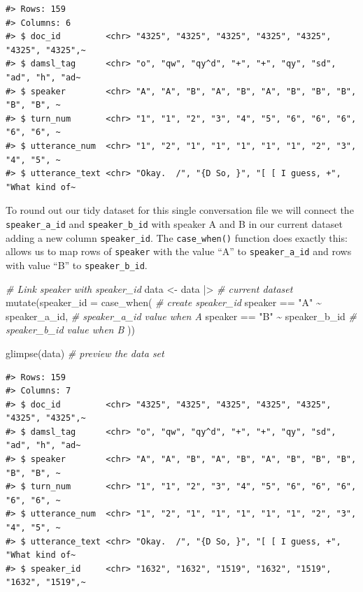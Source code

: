 \documentclass[
  letterpaper,
]{latex/krantz}
\newenvironment{Shaded}{\begin{snugshade}}{\end{snugshade}}
\newcommand{\AttributeTok}[1]{\textcolor[rgb]{0.00,0.00,0.00}{#1}}
\newcommand{\CommentTok}[1]{\textcolor[rgb]{0.00,0.00,0.00}{\textit{#1}}}
\newcommand{\FunctionTok}[1]{\textcolor[rgb]{0.00,0.00,0.00}{#1}}
\newcommand{\NormalTok}[1]{\textcolor[rgb]{0.00,0.00,0.00}{#1}}
\newcommand{\OtherTok}[1]{\textcolor[rgb]{0.00,0.00,0.00}{#1}}
\newcommand{\SpecialCharTok}[1]{\textcolor[rgb]{0.00,0.00,0.00}{#1}}
\newcommand{\StringTok}[1]{\textcolor[rgb]{0.00,0.00,0.00}{#1}}
\begin{document}
\begin{verbatim}
#> Rows: 159
#> Columns: 6
#> $ doc_id         <chr> "4325", "4325", "4325", "4325", "4325", "4325", "4325",~
#> $ damsl_tag      <chr> "o", "qw", "qy^d", "+", "+", "qy", "sd", "ad", "h", "ad~
#> $ speaker        <chr> "A", "A", "B", "A", "B", "A", "B", "B", "B", "B", "B", ~
#> $ turn_num       <chr> "1", "1", "2", "3", "4", "5", "6", "6", "6", "6", "6", ~
#> $ utterance_num  <chr> "1", "2", "1", "1", "1", "1", "1", "2", "3", "4", "5", ~
#> $ utterance_text <chr> "Okay.  /", "{D So, }", "[ [ I guess, +", "What kind of~
\end{verbatim}

To round out our tidy dataset for this single conversation file we will
connect the \texttt{speaker\_a\_id} and \texttt{speaker\_b\_id} with
speaker A and B in our current dataset adding a new column
\texttt{speaker\_id}. The \texttt{case\_when()} function does exactly
this: allows us to map rows of \texttt{speaker} with the value ``A'' to
\texttt{speaker\_a\_id} and rows with value ``B'' to
\texttt{speaker\_b\_id}.

\begin{Shaded}
\begin{Highlighting}[]
\CommentTok{\# Link speaker with speaker\_id}
\NormalTok{data }\OtherTok{\textless{}{-}} 
\NormalTok{  data }\SpecialCharTok{|\textgreater{}} \CommentTok{\# current dataset}
  \FunctionTok{mutate}\NormalTok{(}\AttributeTok{speaker\_id =} \FunctionTok{case\_when}\NormalTok{( }\CommentTok{\# create speaker\_id}
\NormalTok{    speaker }\SpecialCharTok{==} \StringTok{"A"} \SpecialCharTok{\textasciitilde{}}\NormalTok{ speaker\_a\_id, }\CommentTok{\# speaker\_a\_id value when A}
\NormalTok{    speaker }\SpecialCharTok{==} \StringTok{"B"} \SpecialCharTok{\textasciitilde{}}\NormalTok{ speaker\_b\_id }\CommentTok{\# speaker\_b\_id value when B}
\NormalTok{  ))}

\FunctionTok{glimpse}\NormalTok{(data) }\CommentTok{\# preview the data set}
\end{Highlighting}
\end{Shaded}

\begin{verbatim}
#> Rows: 159
#> Columns: 7
#> $ doc_id         <chr> "4325", "4325", "4325", "4325", "4325", "4325", "4325",~
#> $ damsl_tag      <chr> "o", "qw", "qy^d", "+", "+", "qy", "sd", "ad", "h", "ad~
#> $ speaker        <chr> "A", "A", "B", "A", "B", "A", "B", "B", "B", "B", "B", ~
#> $ turn_num       <chr> "1", "1", "2", "3", "4", "5", "6", "6", "6", "6", "6", ~
#> $ utterance_num  <chr> "1", "2", "1", "1", "1", "1", "1", "2", "3", "4", "5", ~
#> $ utterance_text <chr> "Okay.  /", "{D So, }", "[ [ I guess, +", "What kind of~
#> $ speaker_id     <chr> "1632", "1632", "1519", "1632", "1519", "1632", "1519",~
\end{verbatim}
\end{document}
